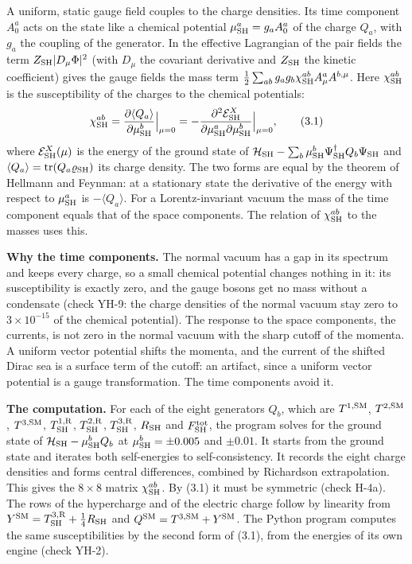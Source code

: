 \documentclass[
  10pt,
]{article}
\begin{document}
A uniform, static gauge field couples to the charge densities. Its time
component \(A^a_0\) acts on the state like a chemical potential
\(\mu^a_{\rm SH}=g_aA^a_0\) of the charge \(Q_a\), with \(g_a\) the
coupling of the generator. In the effective Lagrangian of the pair
fields the term \(Z_{\rm SH}\lvert D_\mu\Phi\rvert^2\) (with \(D_\mu\)
the covariant derivative and \(Z_{\rm SH}\) the kinetic coefficient)
gives the gauge fields the mass term
\(\tfrac12\sum_{ab}g_ag_b\chi^{ab}_{\rm SH}A^a_\mu A^{b,\mu}\). Here
\(\chi^{ab}_{\rm SH}\) is the susceptibility of the charges to the
chemical potentials:
\[\chi^{ab}_{\rm SH}=\frac{\partial\langle Q_a\rangle}{\partial\mu^b_{\rm SH}}\Big\rvert_{\mu=0}=-\frac{\partial^2\mathcal E^X_{\rm SH}}{\partial\mu^a_{\rm SH}\partial\mu^b_{\rm SH}}\Big\rvert_{\mu=0},\tag{3.1}\]
where \(\mathcal E^X_{\rm SH}(\mu)\) is the energy of the ground state
of
\(\mathcal H_{\rm SH}-\sum_b\mu^b_{\rm SH}\Psi^\dagger_{\rm SH}Q_b\Psi_{\rm SH}\)
and \(\langle Q_a\rangle=\mathrm{tr}(Q_a\varrho_{\rm SH})\) its charge
density. The two forms are equal by the theorem of Hellmann and Feynman:
at a stationary state the derivative of the energy with respect to
\(\mu^a_{\rm SH}\) is \(-\langle Q_a\rangle\). For a Lorentz-invariant
vacuum the mass of the time component equals that of the space
components. The relation of \(\chi^{ab}_{\rm SH}\) to the masses uses
this.

\textbf{Why the time components.} The normal vacuum has a gap in its
spectrum and keeps every charge, so a small chemical potential changes
nothing in it: its susceptibility is exactly zero, and the gauge bosons
get no mass without a condensate (check YH-9: the charge densities of
the normal vacuum stay zero to \(3\times10^{-15}\) of the chemical
potential). The response to the space components, the currents, is not
zero in the normal vacuum with the sharp cutoff of the momenta. A
uniform vector potential shifts the momenta, and the current of the
shifted Dirac sea is a surface term of the cutoff: an artifact, since a
uniform vector potential is a gauge transformation. The time components
avoid it.

\textbf{The computation.} For each of the eight generators \(Q_b\),
which are \(T^{1,{\rm SM}}\), \(T^{2,{\rm SM}}\), \(T^{3,{\rm SM}}\),
\(T^{1,{\rm R}}_{\rm SH}\), \(T^{2,{\rm R}}_{\rm SH}\),
\(T^{3,{\rm R}}_{\rm SH}\), \(R_{\rm SH}\) and \(F^{\rm tot}_{\rm SH}\),
the program solves for the ground state of
\(\mathcal H_{\rm SH}-\mu^b_{\rm SH}Q_b\) at \(\mu^b_{\rm SH}=\pm0.005\)
and \(\pm0.01\). It starts from the ground state and iterates both
self-energies to self-consistency. It records the eight charge densities
and forms central differences, combined by Richardson extrapolation.
This gives the \(8\times8\) matrix \(\chi^{ab}_{\rm SH}\). By (3.1) it
must be symmetric (check H-4a). The rows of the hypercharge and of the
electric charge follow by linearity from
\(Y^{\rm SM}=T^{3,{\rm R}}_{\rm SH}+\tfrac14R_{\rm SH}\) and
\(Q^{\rm SM}=T^{3,{\rm SM}}+Y^{\rm SM}\). The Python program computes
the same susceptibilities by the second form of (3.1), from the energies
of its own engine (check YH-2).
\end{document}
